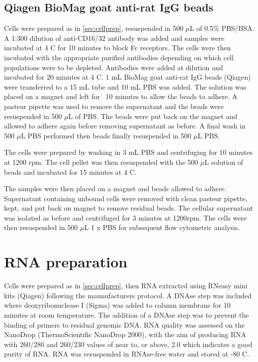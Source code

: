 \subsection{Qiagen BioMag goat anti-rat IgG beads}

Cells were prepared as in \cref{sec:cellprep}, resuspended in 500 $\mu$L of 0.5\% PBS/BSA.
A 1:300 dilution of anti-CD16/32 antibody was added and samples were incubated at 4 \textdegree C for 10 minutes to block Fc receptors.
The cells were then incubated with the appropriate purified antibodies depending on which cell populations were to be depleted.
Antibodies were added at  dilution and incubated for 20 minutes at 4 \textdegree C.
1 mL  BioMag goat anti-rat IgG beads (Qiagen) were transferred to a 15 mL tube and 10 mL PBS was added.
The solution was placed on a magnet and left for ~10 minutes to allow the beads to adhere.
A pasteur pipette was used to remove the supernatant and the beads were resuspended in 500 $\mu$L of PBS.
The beads were put back on the magnet and allowed to adhere again before removing supernatant as before.
A final wash in 500 $\mu$L PBS performed then beads finally resuspended in 500 $\mu$L PBS.

The cells were prepared by washing in 3 mL PBS and centrifuging for 10 minutes at 1200 rpm.
The cell pellet was then resuspended with the 500 $\mu$L solution of beads and incubated for 15 minutes at 4 \textdegree C.

The samples were then placed on a magnet and beads allowed to adhere.
Supernatant containing unbound cells were removed with clean pasteur pipette, kept, and put back on magnet to remove residual beads.
The cellular supernatant was isolated as before and centrifuged for 3 minutes at 1200rpm.
The cells were then resuspended in 500 $\mu$L 1 x PBS for subsequent flow cytometric analysis.

\section{RNA preparation}

Cells were prepared as in \cref{sec:cellprep}, then RNA extracted using RNeasy mini kits (Qiagen) following the maunufacturers protocol.
A DNAse step was included where deoxyribonuclease I (Sigma) was added to column membrane for 10 minutes at room temperature.
The addition of a DNAse step was to prevent the binding of primers to residual genomic DNA.
RNA quality was assessed on the NanoDrop (ThermoScientific NanoDrop 2000), with the aim of producing RNA with 260/280 and 260/230 values of near to, or above, 2.0 which indicates a good purity of RNA.
RNA was resuspended in RNAse-free water and stored at -80 \textdegree C.



